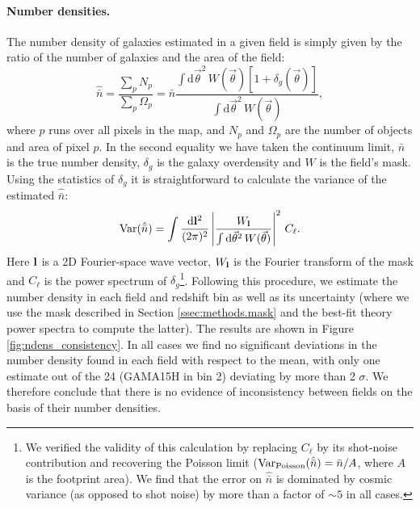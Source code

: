 \documentclass[a4paper,11pt]{article}
\newcommand{\nv}{\vec{\theta}}
\begin{document}
      \paragraph{Number densities.} The number density of galaxies estimated in a given field is simply given by the ratio of the number of galaxies and the area of the field:
      \begin{equation}
        \hat{\bar{n}}=\frac{\sum_p N_p}{\sum_p \Omega_p}= \bar{n} \frac{\int \mathrm{d}\nv^2\,W(\nv)\left[1+\delta_g(\nv)\right]}{\int \mathrm{d}\nv^2\,W(\nv)},
      \end{equation}
      where $p$ runs over all pixels in the map, and $N_p$ and $\Omega_p$ are the number of objects and area of pixel $p$. In the second equality we have taken the continuum limit, $\bar{n}$ is the true number density, $\delta_g$ is the galaxy overdensity and $W$ is the field's mask. Using the statistics of $\delta_g$ it is straightforward to calculate the variance of the estimated $\hat{\bar n}$:
      \begin{equation}
       {\rm Var}(\hat{\bar n})=\int \frac{\mathrm{d}{\bf l}^2}{(2\pi)^2}\left|\frac{W_{\bf l}}{\int \mathrm{d}\nv^2\,W(\nv)}\right|^2\,C_\ell.
      \end{equation}
      Here ${\bf l}$ is a 2D Fourier-space wave vector, $W_{\bf l}$ is the Fourier transform of the mask and $C_\ell$ is the power spectrum of $\delta_g$\footnote{We verified the validity of this calculation by replacing $C_\ell$ by its shot-noise contribution and recovering the Poisson limit (${\rm Var}_{\rm Poisson}(\hat{\bar n})=\bar{n}/A$, where $A$ is the footprint area). We find that the error on $\hat{\bar n}$ is dominated by cosmic variance (as opposed to shot noise) by more than a factor of $\sim5$ in all cases.}. Following this procedure, we estimate the number density in each field and redshift bin as well as its uncertainty (where we use the mask described in Section \ref{ssec:methods.mask} and the best-fit theory power spectra to compute the latter). The results are shown in Figure \ref{fig:ndens_consistency}. In all cases we find no significant deviations in the number density found in each field with respect to the mean, with only one estimate out of the 24 (GAMA15H in bin 2) deviating by more than 2 $\sigma$. We therefore conclude that there is no evidence of inconsistency between fields on the basis of their number densities.
\end{document}
